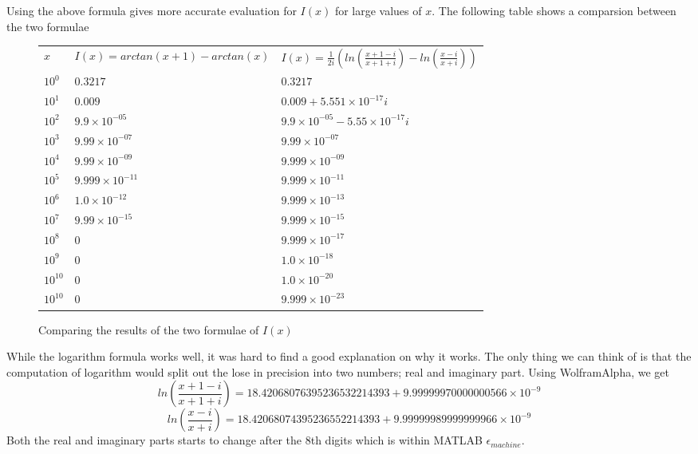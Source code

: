 Using the above formula gives more accurate evaluation for $I(x)$ for large values of $x$. The following table shows a comparsion between the two formulae

\begin{figure}[tbh]
 \centering  
  
\begin{tabular}{ |p{2cm}|| p{7cm}|p{7cm}|}
 \hline
 $x$ &  $I(x)=arctan(x+1) - arctan(x)$  & $I(x) = \frac{1}{2i}  \left( ln\left(\frac{x+1-i}{x+1+i}\right) - ln\left(\frac{x-i}{x+i}\right)\right)$ \\ \hhline{|=|=|=|}
 $10^0$          &$0.3217$        &$0.3217$ \\
 \hline
 $10^1$          &$0.009$        &$0.009 + 5.551\times 10^{-17}i$ \\
 \hline
 $10^2$          &$9.9 \times 10^{-05}$        &$9.9\times 10^{-05} - 5.55\times 10^{-17}i$ \\
 \hline
 $10^3$          &$9.99\times 10^{-07}$        &$9.99\times 10^{-07}$ \\
 \hline
 $10^4$          &$9.99\times 10^{-09}$        &$9.999\times 10^{-09}$ \\
 \hline
 $10^5$          &$9.999\times 10^{-11}$        &$9.999\times 10^{-11}$ \\
 \hline
 $10^6$          &$1.0\times 10^{-12}$        &$9.999\times 10^{-13}$ \\
 \hline
 $10^7$          &$9.99\times 10^{-15}$        &$9.999\times 10^{-15}$ \\
 \hline
 $10^8$          &$0$        &$9.999\times 10^{-17}$ \\
 \hline
 $10^9$          &$0$        &$1.0\times 10^{-18}$ \\
 \hline
 $10^10$         &$0$        &$1.0\times 10^{-20}$ \\
 \hline
 $10^10$         &$0$        &$9.999\times 10^{-23}$ \\
 \hline
 \hline

\end{tabular}
  \caption{Comparing the results of the two formulae of $I(x)$}
   
\end{figure} 
While the logarithm formula works well, it was hard to find a good explanation on why it works. The only thing we can think of is that the computation of logarithm would split out the lose in precision into two numbers; real and imaginary part. Using WolframAlpha, we get 
$$		                                                                
 ln\left(\frac{x+1-i}{x+1+i}\right) = 18.42068076395236532214393 + 9.99999970000000566 \times 10^{-9}
$$
$$
 ln\left(\frac{x-i}{x+i}\right) = 18.42068074395236552214393+ 9.99999989999999966 \times 10^{-9}
$$
Both the real and imaginary parts starts to change after the 8th digits which is within MATLAB $\epsilon_{machine}$.
